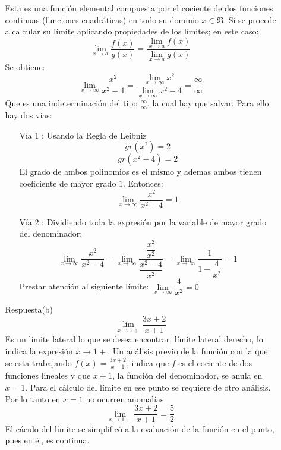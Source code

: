 \documentclass[10pt,twoside]{SelfArx} %
\begin{document}
\begin{enumerate}
\begin{enumerate}
	Esta es una función elemental compuesta por el cociente de dos funciones continuas (funciones cuadráticas) en todo su dominio $ x\in\Re $. Si se procede a calcular su límite aplicando propiedades de los límites; en este caso:
	\[ \lim\limits_{x\rightarrow a}\dfrac{f(x)}{g(x)}=\frac{\lim\limits_{x\rightarrow a}f(x)}{\lim\limits_{x\rightarrow a}g(x)} \]
	Se obtiene:
	\[ \lim\limits_{x\rightarrow\infty}\dfrac{x^{2}}{x^{2}-4}=\frac{\lim\limits_{x\rightarrow\infty}x^{2}}{\lim\limits_{x\rightarrow\infty}x^{2}-4}=\frac{\infty}{\infty} \]
	Que es una indeterminación del tipo $ \frac{\infty}{\infty}  $, la cual hay que salvar. Para ello hay dos vías:
	\begin{enumerate}
		\item[Vía 1]: Usando la Regla de Leibniz\\
		\[ gr(x^{2})=2 \]
		\[ gr(x^{2}-4)=2 \]
		El grado de ambos polinomios es el mismo y ademas ambos tienen coeficiente de mayor grado $ 1 $. Entonces:
		\[ \lim\limits_{x\rightarrow\infty}\dfrac{x^{2}}{x^{2}-4}=1 \]
		\item[Vía 2]: Dividiendo toda la expresión por la variable de mayor grado del denominador:
		\[ \lim\limits_{x\rightarrow\infty}\dfrac{x^{2}}{x^{2}-4}=\lim\limits_{x\rightarrow\infty}\dfrac{\dfrac{x^{2}}{x^{2}}}{\dfrac{x^{2}-4}{x^{2}}}=\lim\limits_{x\rightarrow\infty}\dfrac{1}{1-\dfrac{4}{x^{2}}}=1 \]
		Prestar atención al siguiente límite: $ \lim\limits_{x\rightarrow\infty}\dfrac{4}{x^{2}}=0 $
	\end{enumerate}
	\item[Respuesta(b)]
	\[ \lim\limits_{x\rightarrow1+}\frac{3x+2}{x+1} \]
	Es un límite lateral lo que se desea encontrar, límite lateral derecho, lo indica la expresión $ x\rightarrow1+ $. Un análisis previo de la función con la que se esta trabajando $ f(x)=\frac{3x+2}{x+1} $, indica que $ f $ es el cociente de dos funciones lineales y que $ x+1 $, la función del denominador, se anula en $ x=1 $. Para el cálculo del límite en ese punto se requiere de otro análisis. Por lo tanto en $ x=1 $ no ocurren anomalías.\\
	\[ \lim\limits_{x\rightarrow1+}\frac{3x+2}{x+1}=\dfrac{5}{2} \]
	El cáculo del límite se simplificó a la evaluación de la función en el punto, pues en él, es continua.
	

\end{enumerate}
\end{enumerate}
\end{document}
